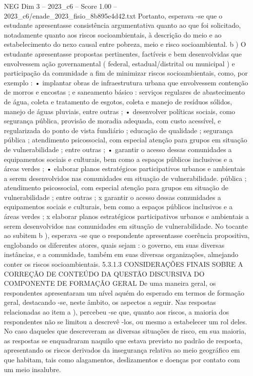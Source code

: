 \begin{textsample}{NEG Dim 3 – 2023\_c6 – Score 1.00 – 2023\_c6/enade\_2023\_fisio\_8b895e4d42.txt}
Portanto, esperava -se que o estudante apresentasse consistência argumentativa quanto ao que foi solicitado, notadamente quanto aos riscos socioambientais, à descrição do meio e ao estabelecimento do nexo causal entre pobreza, meio e risco socioambiental. b ) O estudante apresentasse propostas pertinentes, factíveis e bem desenvolvidas que envolvessem ação governamental ( federal, estadual/distrital ou municipal ) e participação da comunidade a fim de minimizar riscos socioambientais, como, por exemplo : • implantar obras de infraestrutura urbana que envolvessem contenção de morros e encostas ; e saneamento básico : serviços regulares de abastecimento de água, coleta e tratamento de esgotos, coleta e manejo de resíduos sólidos, manejo de águas pluviais, entre outras ; • desenvolver políticas sociais, como segurança pública, provisão de moradia adequada, com custo acessível, e regularizada do ponto de vista fundiário ; educação de qualidade ; segurança pública ; atendimento psicossocial, com especial atenção para grupos em situação de vulnerabilidade ; entre outras ; • garantir o acesso dessas comunidades a equipamentos sociais e culturais, bem como a espaços públicos inclusivos e a áreas verdes ; • elaborar planos estratégicos participativos urbanos e ambientais a serem desenvolvidos nas comunidades em situação de vulnerabilidade. pública ; atendimento psicossocial, com especial atenção para grupos em situação de vulnerabilidade ; entre outras ; x garantir o acesso dessas comunidades a equipamentos sociais e culturais, bem como a espaços públicos inclusivos e a áreas verdes ; x elaborar planos estratégicos participativos urbanos e ambientais a serem desenvolvidos nas comunidades em situação de vulnerabilidade.
No tocante ao subitem b ), esperava -se que o respondente apresentasse coerência propositiva, englobando os diferentes atores, quais sejam : o governo, em suas diversas instâncias, e a comunidade, também em suas diversas organizações, almejando conter os riscos socioambientais. 5.3.1.3 CONSIDERAÇÕES FINAIS SOBRE A CORREÇÃO DE CONTEÚDO DA QUESTÃO DISCURSIVA DO COMPONENTE DE FORMAÇÃO GERAL De uma maneira geral, os respondentes apresentaram um nível aquém do esperado em termos de formação geral, destacando -se, neste âmbito, os aspectos a seguir.
Nas respostas relacionadas ao item a ), percebeu -se que, quanto aos riscos, a maioria dos respondentes não se limitou a descrevê -los, ou mesmo a estabelecer um rol deles.
No caso daqueles que descreveram as diversas situações de risco, em sua maioria, as respostas se enquadraram naquilo que estava previsto no padrão de resposta, apresentando os riscos derivados da insegurança relativa ao meio geográfico em que habitam, tais como alagamentos, deslizamentos e doenças por contato com um meio insalubre.

\end{textsample}
